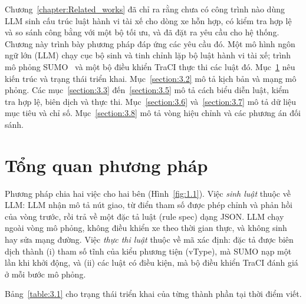 \documentclass[../main.tex]{subfiles}
\begin{document}

Chương~\ref{chapter:Related_works} đã chỉ ra rằng chưa có công trình nào dùng LLM sinh cấu trúc luật hành vi tài xế cho dòng xe hỗn hợp, có kiểm tra hợp lệ và so sánh công bằng với một bộ tối ưu, và đã đặt ra yêu cầu cho hệ thống. Chương này trình bày phương pháp đáp ứng các yêu cầu đó. Một mô hình ngôn ngữ lớn (LLM) chạy cục bộ sinh và tinh chỉnh lặp bộ luật hành vi tài xế; trình mô phỏng SUMO~\cite{lopez2018sumo} và một bộ điều khiển TraCI thực thi các luật đó. Mục~\ref{section:3.1} nêu kiến trúc và trạng thái triển khai. Mục~\ref{section:3.2} mô tả kịch bản và mạng mô phỏng. Các mục~\ref{section:3.3} đến~\ref{section:3.5} mô tả cách biểu diễn luật, kiểm tra hợp lệ, biên dịch và thực thi. Mục~\ref{section:3.6} và~\ref{section:3.7} mô tả dữ liệu mục tiêu và chỉ số. Mục~\ref{section:3.8} mô tả vòng hiệu chỉnh và các phương án đối sánh.

\section{Tổng quan phương pháp}
\label{section:3.1}

Phương pháp chia hai việc cho hai bên (Hình~\ref{fig:1.1}). Việc \emph{sinh luật} thuộc về LLM: LLM nhận mô tả nút giao, từ điển tham số được phép chỉnh và phản hồi của vòng trước, rồi trả về một đặc tả luật (rule spec) dạng JSON. LLM chạy ngoài vòng mô phỏng, không điều khiển xe theo thời gian thực, và không sinh hay sửa mạng đường. Việc \emph{thực thi luật} thuộc về mã xác định: đặc tả được biên dịch thành (i) tham số tĩnh của kiểu phương tiện (vType), mà SUMO nạp một lần khi khởi động, và (ii) các luật có điều kiện, mà bộ điều khiển TraCI đánh giá ở mỗi bước mô phỏng.

Bảng~\ref{table:3.1} cho trạng thái triển khai của từng thành phần tại thời điểm viết.
\end{document}
